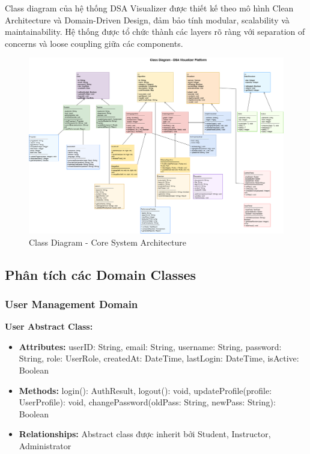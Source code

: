 Class diagram của hệ thống DSA Visualizer được thiết kế theo mô hình Clean Architecture và Domain-Driven Design, đảm bảo tính modular, scalability và maintainability. Hệ thống được tổ chức thành các layers rõ ràng với separation of concerns và loose coupling giữa các components.

\begin{figure}[H]
\centering
\includegraphics[width=1.0\textwidth]{enhanced-diagrams/class-diagram-clean.png}
\caption{Class Diagram - Core System Architecture}
\label{fig:class-diagram-overview}
\end{figure}

\subsection{Phân tích các Domain Classes}
\label{subsec:domain-classes}

\subsubsection{User Management Domain}

\textbf{User Abstract Class:}
\begin{itemize}
    \item \textbf{Attributes:} userID: String, email: String, username: String, password: String, role: UserRole, createdAt: DateTime, lastLogin: DateTime, isActive: Boolean
    \item \textbf{Methods:} login(): AuthResult, logout(): void, updateProfile(profile: UserProfile): void, changePassword(oldPass: String, newPass: String): Boolean
    \item \textbf{Relationships:} Abstract class được inherit bởi Student, Instructor, Administrator
\end{itemize}

